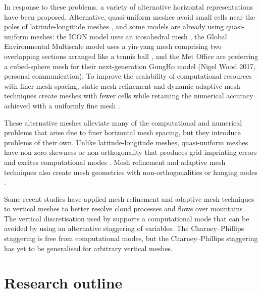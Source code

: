 In response to these problems, a variety of alternative horizontal representations have been proposed.
Alternative, quasi-uniform meshes avoid small cells near the poles of latitude-longitude meshes \citep{staniforth-thuburn2012}, and some models are already using quasi-uniform meshes: the ICON model uses an icosahedral mesh \citep{zaengl2015}, the Global Environmental Multiscale model uses a yin-yang mesh comprising two overlapping sections arranged like a tennis ball \citep{qaddouri-lee2011}, and the Met Office are preferring a cubed-sphere mesh for their next-generation GungHo model (Nigel Wood 2017, personal communication).
To improve the scalability of computational resources with finer mesh spacing, static mesh refinement and dynamic adaptive mesh techniques create meshes with fewer cells while retaining the numerical accuracy achieved with a uniformly fine mesh \citep{jablonowski2009}.

These alternative meshes alleviate many of the computational and numerical problems that arise due to finer horizontal mesh spacing, but they introduce problems of their own. 
Unlike latitude-longitude meshes, quasi-uniform meshes have non-zero skewness or non-orthogonality that produces grid imprinting errors and excites computational modes \citep{weller2012}.
Mesh refinement and adaptive mesh techniques also create mesh geometries with non-orthogonalities or hanging nodes \citep{marras2016}.

Some recent studies have applied mesh refinement and adaptive mesh techniques to vertical meshes to better resolve cloud processes \citep{mueller2013} and flows over mountains \citep{yamazaki-satomura2012}.  
The vertical discretisation used by \citet{yamazaki-satomura2012} supports a computational mode \citep{thuburn-woolings2005} that can be avoided by using an alternative staggering of variables.
The Charney--Phillips staggering is free from computational modes, but the Charney--Phillips staggering has yet to be generalised for arbitrary vertical meshes.

\section{Research outline}

